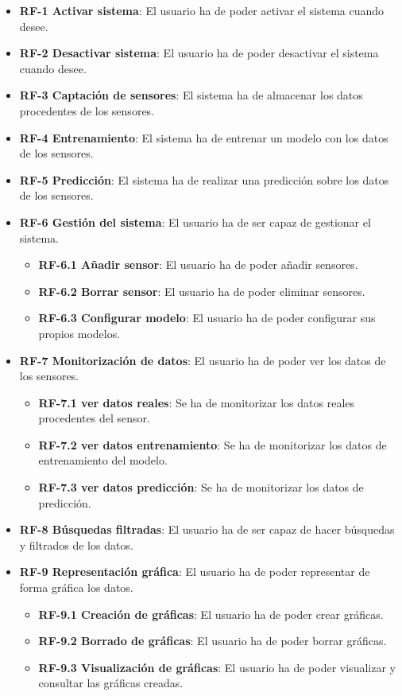 \begin{itemize}

    \item \textbf{RF-1 Activar sistema}: El usuario ha de poder activar el sistema cuando desee.
    
    \item \textbf{RF-2 Desactivar sistema}: El usuario ha de poder desactivar el sistema cuando desee.
    
    \item \textbf{RF-3 Captación de sensores}: El sistema ha de almacenar los datos procedentes de los sensores.
    	
    \item \textbf{RF-4 Entrenamiento}: El sistema ha de entrenar un modelo con los datos de los sensores.

    \item \textbf{RF-5 Predicción}: El sistema ha de realizar una predicción sobre los datos de los sensores.

    \item \textbf{RF-6 Gestión del sistema}: El usuario ha de ser capaz de gestionar el sistema.
    \begin{itemize}
	    \item \textbf{RF-6.1 Añadir sensor}: El usuario ha de poder añadir sensores.
	    \item \textbf{RF-6.2 Borrar sensor}: El usuario ha de poder eliminar sensores.
	    \item \textbf{RF-6.3 Configurar modelo}: El usuario ha de poder configurar sus propios modelos.
	\end{itemize}
	
	\item \textbf{RF-7 Monitorización de datos}: El usuario ha de poder ver los datos de los sensores.
	\begin{itemize}
	    \item \textbf{RF-7.1 ver datos reales}: Se ha de monitorizar los datos reales procedentes del sensor.
	    \item \textbf{RF-7.2 ver datos entrenamiento}: Se ha de monitorizar los datos de entrenamiento del modelo.
	    \item \textbf{RF-7.3 ver datos predicción}: Se ha de monitorizar los datos de predicción.
	\end{itemize}
	\item \textbf{RF-8 Búsquedas filtradas}: El usuario ha de ser capaz de hacer búsquedas y filtrados de los datos.
	\item \textbf{RF-9 Representación gráfica}: El usuario ha de poder representar de forma gráfica los datos.
	\begin{itemize}
	    \item \textbf{RF-9.1 Creación de gráficas}: El usuario ha de poder crear gráficas.
	    \item \textbf{RF-9.2 Borrado de gráficas}: El usuario ha de poder borrar gráficas.
	    \item \textbf{RF-9.3 Visualización de gráficas}: El usuario ha de poder visualizar y consultar las gráficas creadas.
	\end{itemize}
	
\end{itemize}	

